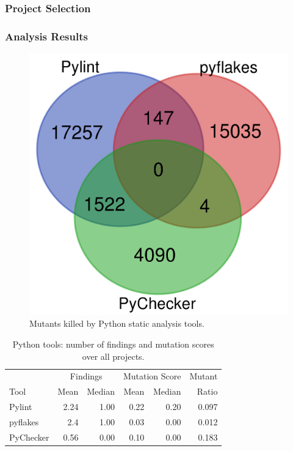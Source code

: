 \subsubsection{Project Selection}

\subsubsection{Analysis Results}

\begin{figure}
  \includegraphics[width=\columnwidth]{python.png}
  \caption{Mutants killed by Python static analysis tools.}
  \label{fig:pythonvenn}
\end{figure}

\begin{table}
  \begin{tabular}{l|r|r|r|r|r}
    & \multicolumn{2}{|c|}{Findings} & \multicolumn{2}{|c|}{Mutation Score}  & Mutant \\
    Tool & Mean & Median & Mean & Median & Ratio\\
    \hline
    \hline
    Pylint & 2.24 & 1.00 & 0.22 & 0.20 & 0.097 \\
    \hline
    pyflakes & 2.4 & 1.00 & 0.03 & 0.00 & 0.012 \\
    \hline
    PyChecker & 0.56& 0.00 & 0.10 & 0.00 &  0.183 \\
    \hline
  \end{tabular}
  \caption{Python tools: number of findings and mutation scores over all projects.}
  \label{tab:scorepython}
\end{table}

